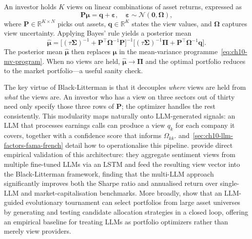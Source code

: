 An investor holds $K$ views on linear combinations of asset returns, expressed as
\begin{equation}
  \mathbf{P}\boldsymbol{\mu} = \mathbf{q} + \boldsymbol{\varepsilon},
  \quad \boldsymbol{\varepsilon} \sim \mathcal{N}(\mathbf{0}, \boldsymbol{\Omega}),
  \label{eq:ch10-bl-views}
\end{equation}
where $\mathbf{P} \in \mathbb{R}^{K \times N}$ picks out assets, $\mathbf{q} \in
\mathbb{R}^K$ states the view values, and $\boldsymbol{\Omega}$ captures view uncertainty.
Applying Bayes' rule yields a posterior mean
\begin{equation}
  \hat{\boldsymbol{\mu}} =
  \bigl[(\tau\boldsymbol{\Sigma})^{-1} + \mathbf{P}^\top\boldsymbol{\Omega}^{-1}\mathbf{P}\bigr]^{-1}
  \bigl[(\tau\boldsymbol{\Sigma})^{-1}\boldsymbol{\Pi} + \mathbf{P}^\top\boldsymbol{\Omega}^{-1}\mathbf{q}\bigr].
  \label{eq:ch10-bl-posterior}
\end{equation}
The posterior mean $\hat{\boldsymbol{\mu}}$ then replaces $\boldsymbol{\mu}$ in the
mean-variance programme~\eqref{eq:ch10-mv-program}. When no views are held,
$\hat{\boldsymbol{\mu}} \to \boldsymbol{\Pi}$ and the optimal portfolio reduces to the
market portfolio---a useful sanity check.

The key virtue of Black-Litterman is that it decouples \emph{where} views are held from
\emph{what} the views are. An investor who has a view on three sectors out of thirty need
only specify those three rows of $\mathbf{P}$; the optimizer handles the rest
consistently. This modularity maps naturally onto LLM-generated signals: an LLM that
processes earnings calls can produce a view $q_k$ for each company it covers, together
with a confidence score that informs $\Omega_{kk}$. 
and~\ref{sec:ch10-llm-factors-fama-french} detail how to operationalise this pipeline.
\citet{MantshimuliMwamba2025} provide direct empirical validation of this architecture:
they aggregate sentiment views from multiple fine-tuned LLMs via an LSTM and feed the
resulting view vector into the Black-Litterman framework, finding that the multi-LLM
approach significantly improves both the Sharpe ratio and annualised return over
single-LLM and market-capitalisation benchmarks. More broadly, \citet{Yuksel2025alpha}
show that an LLM-guided evolutionary tournament can select portfolios from large asset
universes by generating and testing candidate allocation strategies in a closed loop,
offering an empirical baseline for treating LLMs as portfolio optimizers rather than
merely view providers.

